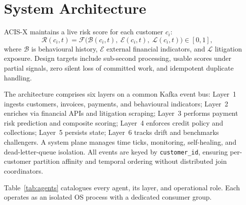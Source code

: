 \documentclass[pdflatex,sn-mathphys-num]{sn-jnl}
\theoremstyle{thmstyleone}
\theoremstyle{thmstyletwo}
\theoremstyle{thmstylethree}
\begin{document}
\section{System Architecture}\label{sec:architecture}

ACIS-X maintains a live risk score for each customer $c_i$:
\begin{equation}
\mathcal{R}(c_i,t) = \mathcal{F}\bigl(\mathcal{B}(c_i,t),\;\mathcal{E}(c_i,t),\;\mathcal{L}(c_i,t)\bigr) \in [0,1],
\label{eq:risk}
\end{equation}
where $\mathcal{B}$ is behavioural history, $\mathcal{E}$ external financial indicators, and $\mathcal{L}$ litigation exposure. Design targets include sub-second processing, usable scores under partial signals, zero silent loss of committed work, and idempotent duplicate handling.

The architecture comprises six layers on a common Kafka event bus: Layer~1 ingests customers, invoices, payments, and behavioural indicators; Layer~2 enriches via financial APIs and litigation scraping; Layer~3 performs payment risk prediction and composite scoring; Layer~4 enforces credit policy and collections; Layer~5 persists state; Layer~6 tracks drift and benchmarks challengers. A system plane manages time ticks, monitoring, self-healing, and dead-letter-queue isolation. All events are keyed by \texttt{customer\_id}, ensuring per-customer partition affinity and temporal ordering without distributed join coordinators.

Table~\ref{tab:agents} catalogues every agent, its layer, and operational role. Each operates as an isolated OS process with a dedicated consumer group.
\end{document}
